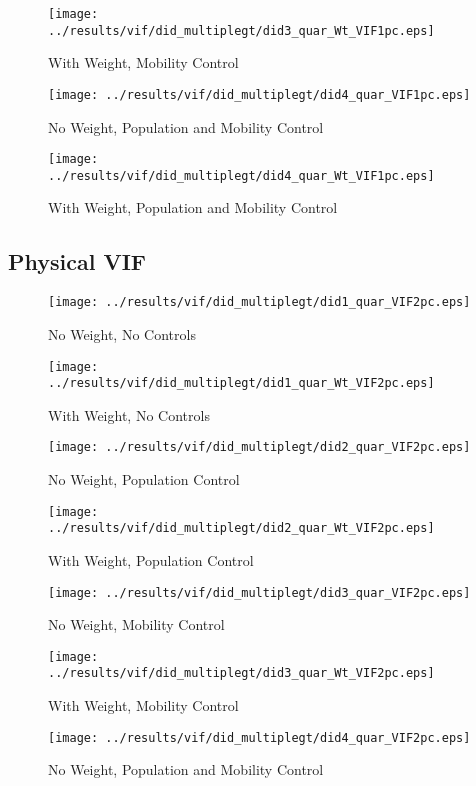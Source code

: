 \documentclass[11pt,letterpaper]{article}
\begin{document}
\begin{figure}[H]
\caption{With Weight, Mobility Control}
\centering
\texttt{[image: ../results/vif/did\_multiplegt/did3\_quar\_Wt\_VIF1pc.eps]}
\end{figure}
\begin{figure}[H]
\caption{No Weight, Population and Mobility Control}
\centering
\texttt{[image: ../results/vif/did\_multiplegt/did4\_quar\_VIF1pc.eps]}
\end{figure}

\begin{figure}[H]
\caption{With Weight, Population and Mobility Control}
\centering
\texttt{[image: ../results/vif/did\_multiplegt/did4\_quar\_Wt\_VIF1pc.eps]}
\end{figure}
	
	\subsection{Physical VIF}
\begin{figure}[H]
\caption{No Weight, No Controls}
\centering
\texttt{[image: ../results/vif/did\_multiplegt/did1\_quar\_VIF2pc.eps]}
\end{figure}

\begin{figure}[H]
\caption{With Weight, No Controls}
\centering
\texttt{[image: ../results/vif/did\_multiplegt/did1\_quar\_Wt\_VIF2pc.eps]}
\end{figure}
\begin{figure}[H]
\caption{No Weight, Population Control}
\centering
\texttt{[image: ../results/vif/did\_multiplegt/did2\_quar\_VIF2pc.eps]}
\end{figure}

\begin{figure}[H]
\caption{With Weight, Population Control}
\centering
\texttt{[image: ../results/vif/did\_multiplegt/did2\_quar\_Wt\_VIF2pc.eps]}
\end{figure}
\begin{figure}[H]
\caption{No Weight, Mobility Control}
\centering
\texttt{[image: ../results/vif/did\_multiplegt/did3\_quar\_VIF2pc.eps]}
\end{figure}

\begin{figure}[H]
\caption{With Weight, Mobility Control}
\centering
\texttt{[image: ../results/vif/did\_multiplegt/did3\_quar\_Wt\_VIF2pc.eps]}
\end{figure}
\begin{figure}[H]
\caption{No Weight, Population and Mobility Control}
\centering
\texttt{[image: ../results/vif/did\_multiplegt/did4\_quar\_VIF2pc.eps]}
\end{figure}
\end{document}
